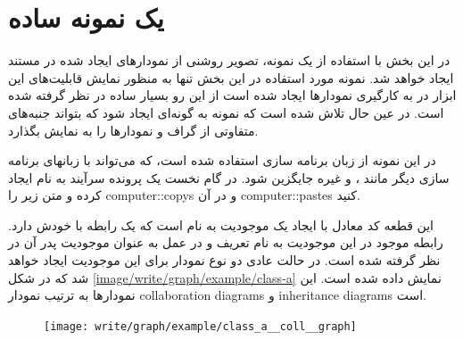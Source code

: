 %
% 
% 
% 
%
% 
% 
% 
\section{یک نمونه ساده}

در این بخش با استفاده از یک نمونه، تصویر روشنی از نمودارهای ایجاد شده در مستند
ایجاد خواهد شد. نمونه مورد استفاده در این بخش تنها به منظور نمایش قابلیت‌های این
ابزار در به کارگیری نمودارها ایجاد شده است از این رو بسیار ساده در نظر گرفته شده
است. در عین حال تلاش شده است که نمونه به گونه‌ای ایجاد شود که بتواند جنبه‌های
متفاوتی از گراف و نمودارها را به نمایش بگذارد.


در این نمونه از زبان برنامه سازی  استفاده شده است، که می‌تواند با
زبانهای برنامه سازی دیگر مانند ،  و غیره جایگزین شود. در گام
نخست یک پرونده سرآیند به نام  ایجاد کرده و متن زیر را
\glspl{computer::copy} و در آن \glspl{computer::paste} کنید.


این قطعه کد معادل با ایجاد یک موجودیت به نام  است که یک رابطه با خودش
دارد. رابطه موجود در این موجودیت به نام  تعریف و در
عمل به عنوان موجودیت پدر آن در نظر گرفته شده است. در حالت عادی دو نوع نمودار
برای این موجودیت ایجاد خواهد شد که در شکل \ref{image/write/graph/example/class-a}
نمایش داده شده است. این نمودارها به ترتیب نمودار \glspl{collaboration diagram} و
\glspl{inheritance diagram} است.

\begin{figure}
    \centering
    \texttt{[image: write/graph/example/class\_a\_\_coll\_\_graph]}
    \label{image/write/graph/example/class_a__coll__graph}
\end{figure}

